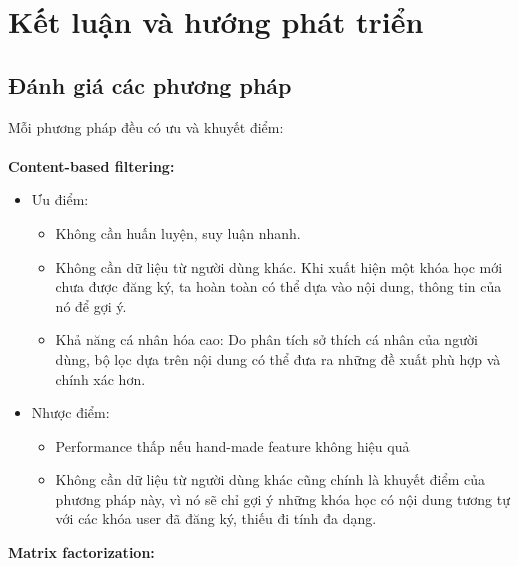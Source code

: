 \section{Kết luận và hướng phát triển}
\subsection{Đánh giá các phương pháp}
Mỗi phương pháp đều có ưu và khuyết điểm:\\
\\
\textbf{Content-based filtering:}
\begin{itemize}
    \item Ưu điểm:
    \begin{itemize}
        \item Không cần huấn luyện, suy luận nhanh.
        \item Không cần dữ liệu từ người dùng khác. Khi xuất hiện một khóa học mới chưa được đăng ký, ta hoàn toàn có thể dựa vào nội dung, thông tin của nó để gợi ý.
        \item Khả năng cá nhân hóa cao: Do phân tích sở thích cá nhân của người dùng, bộ lọc dựa trên nội dung có thể đưa ra những đề xuất phù hợp và chính xác hơn.
    \end{itemize}
    \item Nhược điểm:
    \begin{itemize}
        \item Performance thấp nếu hand-made feature không hiệu quả
        \item Không cần dữ liệu từ người dùng khác cũng chính là khuyết điểm của phương pháp này, vì nó sẽ chỉ gợi ý những khóa học có nội dung tương tự với các khóa user đã đăng ký, thiếu đi tính đa dạng.
    \end{itemize}
\end{itemize}
\textbf{Matrix factorization:}
